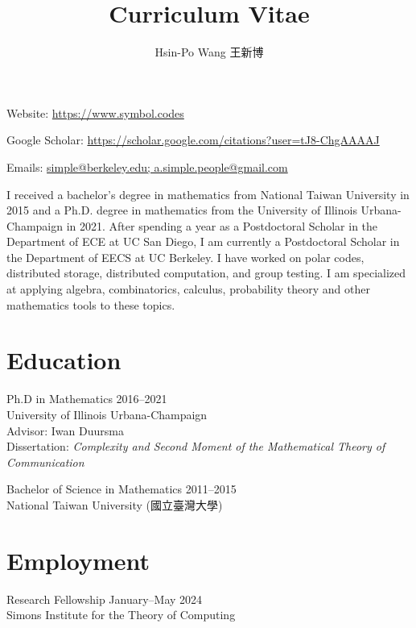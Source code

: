 \documentclass{article}
\def\email#1{\href{mailto:#1}{#1}}
\begin{document}
                        \title{Curriculum Vitae}

                 \author{Hsin-Po Wang {\zhfamily 王新博}}

                               \maketitle


Website: \url{https://www.symbol.codes}

Google Scholar:
            \url{https://scholar.google.com/citations?user=tJ8-ChgAAAAJ}

Emails: \email{simple@berkeley.edu; a.simple.people@gmail.com}

I received a bachelor's degree in mathematics from National Taiwan
University in 2015 and a Ph.D. degree in mathematics from the University
of Illinois Urbana-Champaign in 2021.  After spending a year as a
Postdoctoral Scholar in the Department of ECE at UC San Diego, I am
currently a Postdoctoral Scholar in the Department of EECS at UC
Berkeley.  I have worked on polar codes, distributed storage,
distributed computation, and group testing.  I am specialized at
applying algebra, combinatorics, calculus, probability theory
and other mathematics tools to these topics.


\section{Education}

Ph.D in Mathematics                                 \hfill 2016--2021 \\
University of Illinois Urbana-Champaign                               \\
Advisor: Iwan Duursma                                                 \\
Dissertation: \emph{Complexity and Second Moment
of the Mathematical Theory of Communication}

Bachelor of Science in Mathematics                  \hfill 2011--2015 \\
National Taiwan University ({\zhfamily 國立臺灣大學})

\section{Employment}

Research Fellowship                          \hfill January--May 2024 \\
Simons Institute for the Theory of Computing
\end{document}
